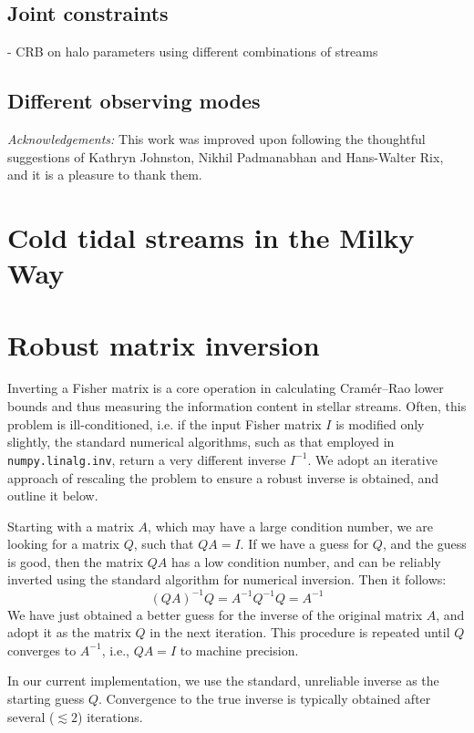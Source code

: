 \documentclass[modern]{aastex61}
\begin{document}
\subsection{Joint constraints}
- CRB on halo parameters using different combinations of streams

\subsection{Different observing modes}


\emph{Acknowledgements:} This work was improved upon following the thoughtful suggestions of Kathryn Johnston, Nikhil Padmanabhan and Hans-Walter Rix, and it is a pleasure to thank them.




\appendix
\section{Cold tidal streams in the Milky Way}
\label{sec:streams}

\section{Robust matrix inversion}
\label{sec:inversion}
Inverting a Fisher matrix is a core operation in calculating Cram\' er--Rao lower bounds and thus measuring the information content in stellar streams. 
Often, this problem is ill-conditioned, i.e. if the input Fisher matrix $I$ is modified only slightly, the standard numerical algorithms, such as that employed in \texttt{numpy.linalg.inv}, return a very different inverse $I^{-1}$.
We adopt an iterative approach of rescaling the problem to ensure a robust inverse is obtained, and outline it below.

Starting with a matrix $A$, which may have a large condition number, we are looking for a matrix $Q$, such that $Q A = I$.
If we have a guess for $Q$, and the guess is good, then the matrix $QA$ has a low condition number, and can be reliably inverted using the standard algorithm for numerical inversion.
Then it follows:
\begin{equation*}
(QA)^{-1} Q = A^{-1} Q^{-1} Q = A^{-1}
\end{equation*}
We have just obtained a better guess for the inverse of the original matrix $A$, and adopt it as the matrix $Q$ in the next iteration.
This procedure is repeated until $Q$ converges to $A^{-1}$, i.e., $Q A = I$ to machine precision.

In our current implementation, we use the standard, unreliable inverse as the starting guess $Q$. 
Convergence to the true inverse is typically obtained after several ($\lesssim2$) iterations.
\end{document}
